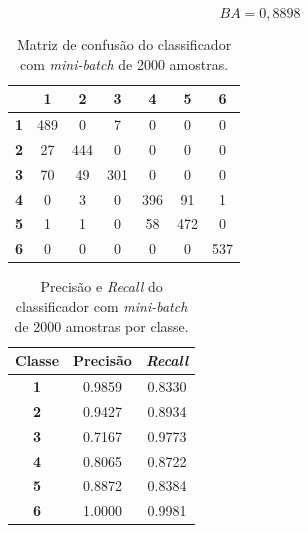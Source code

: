 \begin{equation}\label{eq:ba_lr_2000}
BA = 0,8898
\end{equation}

\begin{table}[H]
\centering
\begin{tabular}{c||c|c|c|c|c|c|}
	\cline{2-7}
	& \textbf{1} & \textbf{2} & \textbf{3} & \textbf{4} & \textbf{5} & \textbf{6} \\ \hline\hline
	\multicolumn{1}{|c||}{\textbf{1}} & 489        & 0          & 7          & 0          & 0          & 0          \\ \hline
	\multicolumn{1}{|c||}{\textbf{2}} & 27         & 444        & 0          & 0          & 0          & 0          \\ \hline
	\multicolumn{1}{|c||}{\textbf{3}} & 70         & 49         & 301        & 0          & 0          & 0          \\ \hline
	\multicolumn{1}{|c||}{\textbf{4}} & 0          & 3          & 0          & 396        & 91         & 1          \\ \hline
	\multicolumn{1}{|c||}{\textbf{5}} & 1          & 1          & 0          & 58         & 472        & 0          \\ \hline
	\multicolumn{1}{|c||}{\textbf{6}} & 0          & 0          & 0          & 0          & 0          & 537        \\ \hline
\end{tabular}
\caption{Matriz de confusão do classificador com \textit{mini-batch} de 2000 amostras.}
\label{tab:mc_lr_2000}
\end{table}

\begin{table}[H]
\centering
\begin{tabular}{c|c|c}
	\textbf{Classe} & \textbf{Precisão} & \textit{\textbf{Recall}} \\ \hline
	\textbf{1}      & 0.9859            & 0.8330                   \\
	\textbf{2}      & 0.9427            & 0.8934                   \\
	\textbf{3}      & 0.7167            & 0.9773                   \\
	\textbf{4}      & 0.8065            & 0.8722                   \\
	\textbf{5}      & 0.8872            & 0.8384                   \\
	\textbf{6}      & 1.0000            & 0.9981                  
\end{tabular}
\caption{Precisão e \textit{Recall} do classificador com \textit{mini-batch} de 2000 amostras por classe.}
\label{tab:pr_lr_2000}
\end{table}

